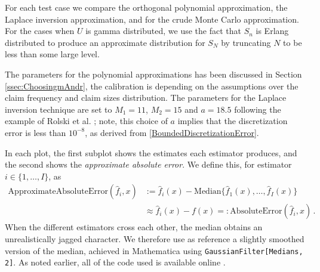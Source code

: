 For each test case we compare the orthogonal polynomial approximation, the Laplace inversion approximation, and for the crude Monte Carlo approximation. For the cases when $U$ is gamma distributed, we use the fact that $S_n$ is Erlang distributed to produce an approximate distribution for $S_N$ by truncating $N$ to be less than some large level. 


The parameters for the polynomial approximations has been discussed in Section \ref{ssec:ChoosingmAndr}, the calibration is depending on the assumptions over the claim frequency and claim sizes distribution.
The parameters for the Laplace inversion technique are set to $M_1=11$, $M_2=15$ and $a=18.5$ following the example of Rolski et al. \cite[Chapter 5, Section 5]{RoScScTe99}; note, this choice of $a$ implies that the discretization error is less than $10^{-8}$, as derived from \eqref{BoundedDiscretizationError}.


In each plot, the first subplot shows the estimates each estimator produces, and the second shows the \emph{approximate absolute error}. We define this, for estimator $i \in \{1,\dots,I\}$, as
\begin{align*}
\text{ApproximateAbsoluteError}( \widehat{f}_i, x ) 
&:= \widehat{f}_i(x)- \text{Median}\big\{ \widehat{f}_1(x),\dots,\widehat{f}_I(x) \big\} \\
&\approx \widehat{f}_i(x)-f(x) =: \text{AbsoluteError}( \widehat{f}_i, x ) \,.
\end{align*}
When the different estimators cross each other, the median obtains an unrealistically jagged character. We therefore use as reference a slightly smoothed version of the median, achieved in Mathematica using \texttt{GaussianFilter[Medians, 2]}. As noted earlier, all of the code used is available online \cite{Code}.


